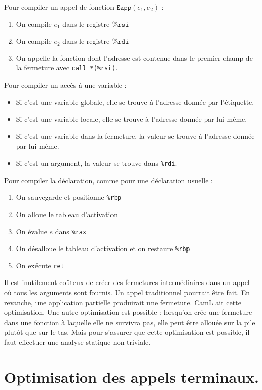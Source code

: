 \documentclass{cours}
\begin{document}
Pour compiler un appel de fonction $\texttt{Eapp}(e_{1}, e_{2})$ :
\begin{enumerate}
    \item On compile $e_{1}$ dans le registre $\texttt{\%rsi}$
    \item On compile $e_{2}$ dans le registre $\texttt{\%rdi}$
    \item On appelle la fonction dont l'adresse est contenue dans le premier champ de la fermeture avec \texttt{call *(\%rsi)}.
\end{enumerate}

Pour compiler un accès à une variable : 
\begin{itemize}
    \item Si c'est une variable globale, elle se trouve à l'adresse donnée par l'étiquette.
    \item Si c'est une variable locale, elle se trouve à l'adresse donnée par lui même.
    \item Si c'est une variable dans la fermeture, la valeur se trouve à l'adresse donnée par lui même.
    \item Si c'est un argument, la valeur se trouve dans \texttt{\%rdi}. 
\end{itemize}

Pour compiler la déclaration, comme pour une déclaration usuelle : 
\begin{enumerate}
    \item On sauvegarde et positionne \texttt{\%rbp}
    \item On alloue le tableau d'activation
    \item On évalue $e$ dans \texttt{\%rax}
    \item On désalloue le tableau d'activation et on restaure \texttt{\%rbp}
    \item On exécute \texttt{ret}
\end{enumerate}

Il est inutilement coûteux de créer des fermetures intermédiaires dans un appel où tous les arguments sont fournis. Un appel traditionnel pourrait être fait. En revanche, une application partielle produirait une fermeture. CamL ait cette optimisation.
Une autre optimisation est possible : lorsqu'on crée une fermeture dans une fonction à laquelle elle ne survivra pas, elle peut être allouée sur la pile plutôt que sur le tas. Mais pour s'assurer que cette optimisation est possible, il faut effectuer une analyse statique non triviale.

\section{Optimisation des appels terminaux.}
\end{document}
